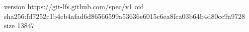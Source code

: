 version https://git-lfs.github.com/spec/v1
oid sha256:fd7252c1b4eb4afad6d86566599a53636e6015c6ea8fca03b64b4d80cc9a9728
size 13847
